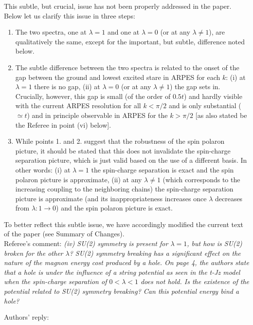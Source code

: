 \documentclass[%
 manuscript,
 amsmath,amssymb,
 aps, onecolumn,
prl,
]{revtex4-1}
\begin{document}
This subtle, but crucial, issue has not been properly addressed in the paper. Below let us clarify this issue in three steps:
\begin{enumerate}
\item The two spectra, one at $\lambda=1$ and one at $\lambda =0$ (or at any $\lambda \neq 1$), are qualitatively the same, except for the important, but subtle, difference noted below.
\item The subtle difference between the two spectra is related to the onset of the gap between the ground and lowest excited stare in ARPES for each $k$: (i) at $\lambda =1$ there is no gap, (ii) at $\lambda = 0 $ (or at any $\lambda \neq 1$) the gap sets in. Crucially, however, this gap is small (of the order of $0.5t$) and hardly visible with the current ARPES resolution for all $k<\pi/2$ and is only substantial ($\simeq t$) and in principle observable in ARPES for the $k>\pi/2$ [as also stated be the Referee in point (vi) below].
\item While points 1. and 2. suggest that the robustness of the spin polaron picture, it should be stated that this does not invalidate the spin-charge separation picture, which is just valid based on the use of a different basis. In other words: (i) at $\lambda =1 $ the spin-charge separation is exact and the spin polaron picture is approximate, (ii) at any $\lambda \neq 1$ (which corresponds to the increasing coupling to the neighboring chains) the spin-charge separation picture is approximate (and its inappropriateness increases once $\lambda$ decreases from $\lambda: 1 \rightarrow 0$) and the spin polaron picture is exact.
\end{enumerate}

To better reflect this subtle issue, we have accordingly modified the current text of the paper (see Summary of Changes).
\\

Referee's comment: {\it \color{blue}(iv) SU(2) symmetry is present for $\lambda=1$, but how is SU(2) broken
for the other $\lambda$? SU(2) symmetry breaking has a significant
effect on the nature of the magnon energy cost produced by a hole. On
page 4, the authors state that a hole is under the influence of a
string potential as seen in the t-Jz model when the spin-charge
separation of $0<\lambda<1$ does not hold. Is the existence of the
potential related to SU(2) symmetry breaking? Can this potential
energy bind a hole?}

Authors' reply:
\end{document}
